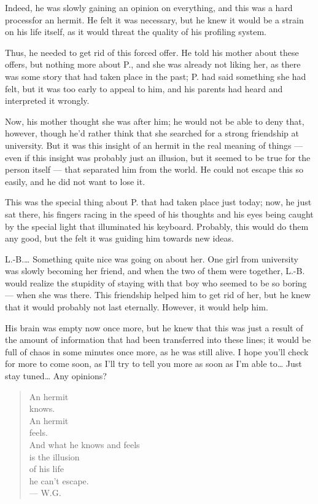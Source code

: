 Indeed, he was slowly gaining an opinion on everything, and this was a hard processfor an hermit. He felt it was necessary, but he knew it would be a strain on his life itself, as it would threat the quality of his profiling system.

Thus, he needed to get rid of this forced offer. He told his mother about these offers, but nothing more about P., and she was already not liking her, as there was some story that had taken place in the past; P. had said something she had felt, but it was too early to appeal to him, and his parents had heard and interpreted it wrongly.

Now, his mother thought she was after him; he would not be able to deny that, however, though he'd rather think that she searched for a strong friendship at university. But it was this insight of an hermit in the real meaning of things --- even if this insight was probably just an illusion, but it seemed to be true for the person itself --- that separated him from the world. He could not escape this so easily, and he did not want to lose it.

This was the special thing about P. that had taken place just today; now, he just sat there, his fingers racing in the speed of his thoughts and his eyes being caught by the special light that illuminated his keyboard. Probably, this would do them any good, but the felt it was guiding him towards new ideas.

L.-B.\ldots
Something quite nice was going on about her. One girl from university was slowly becoming her friend, and when the two of them were together, L.-B. would realize the stupidity of staying with that boy who seemed to be so boring --- when she was there. This friendship helped him to get rid of her, but he knew that it would probably not last eternally. However, it would help him.

His brain was empty now once more, but he knew that this was just a result of the amount of information that had been transferred into these lines; it would be full of chaos in some minutes once more, as he was still alive. 
I hope you'll check for more to come soon, as I'll try to tell you more as soon as I'm able to\ldots
Just stay tuned\ldots
Any opinions?

\begin{verse}
An hermit \\
knows. \\
An hermit \\
feels. \\
And what he knows and feels \\
is the illusion \\
of his life \\
he can't escape. \\
--- W.G.
\end{verse}

